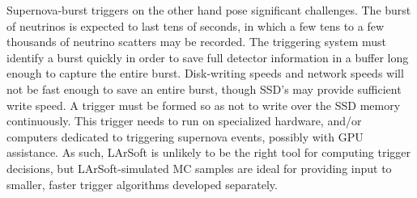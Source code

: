  Supernova-burst triggers on the other hand pose significant challenges.  The burst of neutrinos is expected
to last tens of seconds, in which a few tens to a few thousands of neutrino scatters may be recorded.  The
triggering system must identify a burst quickly in order to save full detector information in a buffer
long enough to capture the entire burst.  Disk-writing speeds and network speeds will not be fast enough
to save an entire burst, though SSD's may provide sufficient write speed.  A trigger must be formed so 
as not to write over the SSD memory continuously.  This trigger needs to run on specialized hardware, and/or
computers dedicated to triggering supernova events, possibly with GPU assistance.  As such, LArSoft is
unlikely to be the right tool for computing trigger decisions, but LArSoft-simulated MC samples are
ideal for providing input to smaller, faster trigger algorithms developed separately.
